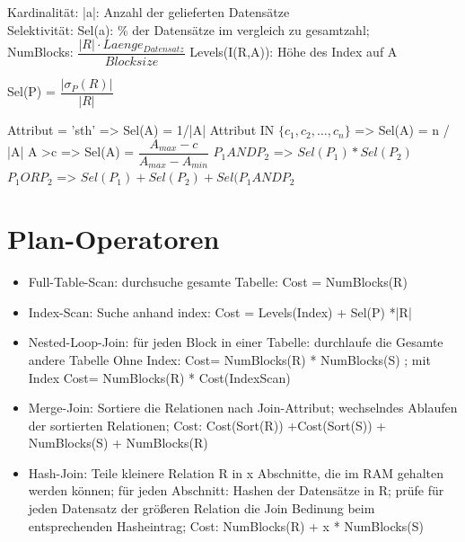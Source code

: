Kardinalität: |a|: Anzahl der gelieferten Datensätze \\
Selektivität: Sel(a): \% der Datensätze im vergleich zu gesamtzahl;\\
NumBlocks: $\dfrac{|R|\cdot Laenge_{Datensatz}}{Blocksize}$
Levels(I(R,A)): Höhe des Index auf A

Sel(P) = $\dfrac{|\sigma_P(R)|}{|R|}$

Attribut = 'sth' => Sel(A) = 1/|A|
Attribut IN $\{c_1,c_2, \dots , c_n\}$ => Sel(A) = n / |A|
A >c => Sel(A) = $\dfrac{A_{max} -c }{A_{max} - A_{min}}$
$P_1 AND P_2$ => $Sel(P_1)*Sel(P_2)$
$P_1 OR P_2$ => $Sel(P_1) + Sel(P_2) + Sel(P_1 AND P_2$

\section*{Plan-Operatoren}
\begin{itemize}
\item Full-Table-Scan: durchsuche gesamte Tabelle: Cost = NumBlocks(R)
\item Index-Scan: Suche anhand index: Cost = Levels(Index) + Sel(P) *|R|
\item Nested-Loop-Join: für jeden Block in einer Tabelle: durchlaufe die Gesamte andere Tabelle
Ohne Index: Cost= NumBlocks(R) * NumBlocks(S) ; mit Index Cost= NumBlocks(R) * Cost(IndexScan)
\item Merge-Join: Sortiere die Relationen nach Join-Attribut; wechselndes Ablaufen der sortierten Relationen;
Cost: Cost(Sort(R)) +Cost(Sort(S)) + NumBlocks(S) + NumBlocks(R)
\item Hash-Join: Teile kleinere Relation R in x Abschnitte, die im RAM gehalten werden können; für jeden Abschnitt: Hashen der Datensätze in R; prüfe für jeden Datensatz der größeren Relation die Join Bedinung beim entsprechenden Hasheintrag; Cost: NumBlocks(R) + x * NumBlocks(S)

\end{itemize}